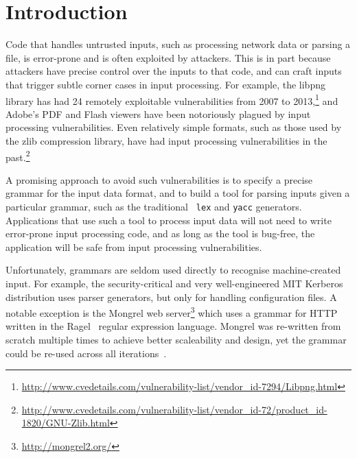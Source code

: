 \section{Introduction}

Code that handles untrusted inputs, such as processing network
data or parsing a file, is error-prone and is often exploited by
attackers.  This is in part because attackers have precise control
over the inputs to that code, and can craft inputs that trigger
subtle corner cases in input processing.  For example, the libpng
library has had 24 remotely exploitable vulnerabilities from 2007 to
2013,\footnote{\url{http://www.cvedetails.com/vulnerability-list/vendor_id-7294/Libpng.html}}
and Adobe's PDF and Flash viewers have been notoriously
plagued by input processing vulnerabilities.  Even relatively
simple formats, such as those used by the zlib compression
library, have had input processing vulnerabilities in the
past.\footnote{\url{http://www.cvedetails.com/vulnerability-list/vendor_id-72/product_id-1820/GNU-Zlib.html}}

A promising approach to avoid such vulnerabilities is to specify
a precise grammar for the input data format, and to build a tool for
parsing inputs given a particular grammar, such as the traditional {\tt
lex} and {\tt yacc} generators.  Applications that use such a tool to
process input data will not need to write error-prone input processing
code, and as long as the tool is bug-free, the application will be safe
from input processing vulnerabilities.

Unfortunately, grammars are seldom used directly to recognise
machine-created input. For example, the security-critical and very
well-engineered MIT Kerberos distribution uses parser generators, but
only for handling configuration files. A notable exception is the Mongrel
web server\footnote{\url{http://mongrel2.org/}} which uses a grammar
for HTTP written in the Ragel~\cite{ragel-paper} regular expression
language. Mongrel was re-written from scratch multiple times to achieve
better scaleability and design, yet the grammar could be  re-used across
all iterations~\cite{patterson-citation}.

